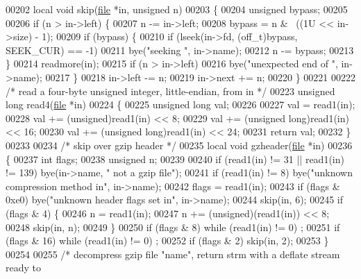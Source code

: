 \begin{DoxyCode}
{00202 local \textcolor{keywordtype}{void} skip(\hyperlink{structfile}{file} *in, \textcolor{keywordtype}{unsigned} n)
00203 \{
00204     \textcolor{keywordtype}{unsigned} bypass;
00205 
00206     \textcolor{keywordflow}{if} (n > in->left) \{
00207         n -= in->left;
00208         bypass = n & ~((1U << in->size) - 1);
00209         \textcolor{keywordflow}{if} (bypass) \{
00210             \textcolor{keywordflow}{if} (lseek(in->fd, (off\_t)bypass, SEEK\_CUR) == -1)
00211                 bye(\textcolor{stringliteral}{"seeking "}, in->name);
00212             n -= bypass;
00213         \}
00214         readmore(in);
00215         \textcolor{keywordflow}{if} (n > in->left)
00216             bye(\textcolor{stringliteral}{"unexpected end of "}, in->name);
00217     \}
00218     in->left -= n;
00219     in->next += n;
00220 \}
00221 
00222 \textcolor{comment}{/* read a four-byte unsigned integer, little-endian, from in */}
00223 \textcolor{keywordtype}{unsigned} \textcolor{keywordtype}{long} read4(\hyperlink{structfile}{file} *in)
00224 \{
00225     \textcolor{keywordtype}{unsigned} \textcolor{keywordtype}{long} val;
00226 
00227     val = read1(in);
00228     val += (unsigned)read1(in) << 8;
00229     val += (\textcolor{keywordtype}{unsigned} long)read1(in) << 16;
00230     val += (\textcolor{keywordtype}{unsigned} long)read1(in) << 24;
00231     \textcolor{keywordflow}{return} val;
00232 \}
00233 
00234 \textcolor{comment}{/* skip over gzip header */}
00235 local \textcolor{keywordtype}{void} gzheader(\hyperlink{structfile}{file} *in)
00236 \{
00237     \textcolor{keywordtype}{int} flags;
00238     \textcolor{keywordtype}{unsigned} n;
00239 
00240     \textcolor{keywordflow}{if} (read1(in) != 31 || read1(in) != 139) bye(in->name, \textcolor{stringliteral}{" not a gzip file"});
00241     \textcolor{keywordflow}{if} (read1(in) != 8) bye(\textcolor{stringliteral}{"unknown compression method in"}, in->name);
00242     flags = read1(in);
00243     \textcolor{keywordflow}{if} (flags & 0xe0) bye(\textcolor{stringliteral}{"unknown header flags set in"}, in->name);
00244     skip(in, 6);
00245     \textcolor{keywordflow}{if} (flags & 4) \{
00246         n = read1(in);
00247         n += (unsigned)(read1(in)) << 8;
00248         skip(in, n);
00249     \}
00250     \textcolor{keywordflow}{if} (flags & 8) \textcolor{keywordflow}{while} (read1(in) != 0) ;
00251     \textcolor{keywordflow}{if} (flags & 16) \textcolor{keywordflow}{while} (read1(in) != 0) ;
00252     \textcolor{keywordflow}{if} (flags & 2) skip(in, 2);
00253 \}
00254 
00255 \textcolor{comment}{/* decompress gzip file "name", return strm with a deflate stream ready to}
}
\end{DoxyCode}
